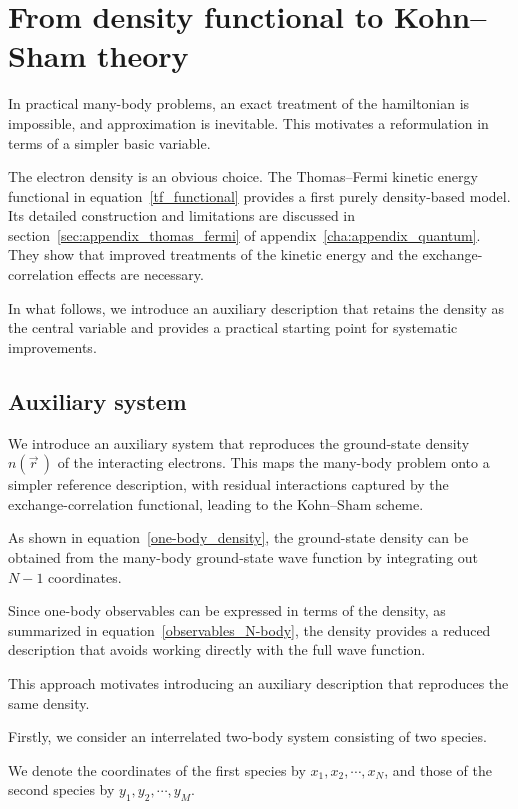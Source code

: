 \newpage
\section{From density functional to Kohn--Sham theory}
\label{sec:from_density_functional_to_Kohn_Sham_theory}

In practical many-body problems, an exact treatment of the hamiltonian is impossible, and approximation is inevitable.
This motivates a reformulation in terms of a simpler basic variable.

The electron density is an obvious choice.
The Thomas--Fermi kinetic energy functional in equation~\eqref{tf_functional} provides a first purely density-based model.
Its detailed construction and limitations are discussed in section~\ref{sec:appendix_thomas_fermi} of appendix~\ref{cha:appendix_quantum}.
They show that improved treatments of the kinetic energy and the exchange-correlation effects are necessary.

In what follows, we introduce an auxiliary description that retains the density as the central variable and provides a practical starting point for systematic improvements.

\subsection{Auxiliary system}

We introduce an auxiliary system that reproduces the ground-state density $n(\vec{r}\,)$ of the interacting electrons.
This maps the many-body problem onto a simpler reference description, with residual interactions captured by the exchange-correlation functional, leading to the Kohn--Sham scheme.

As shown in equation~\eqref{one-body_density}, the ground-state density can be obtained from the many-body ground-state wave function by integrating out $N-1$ coordinates.

Since one-body observables can be expressed in terms of the density, as summarized in equation~\eqref{observables_N-body}, the density provides a reduced description that avoids working directly with the full wave function. 

This approach motivates introducing an auxiliary description that reproduces the same density.

Firstly, we consider an interrelated two-body system consisting of two species.

We denote the coordinates of the first species by $x_1,x_2,\cdots,x_N$,
and those of the second species by $y_1,y_2,\cdots,y_M$.

